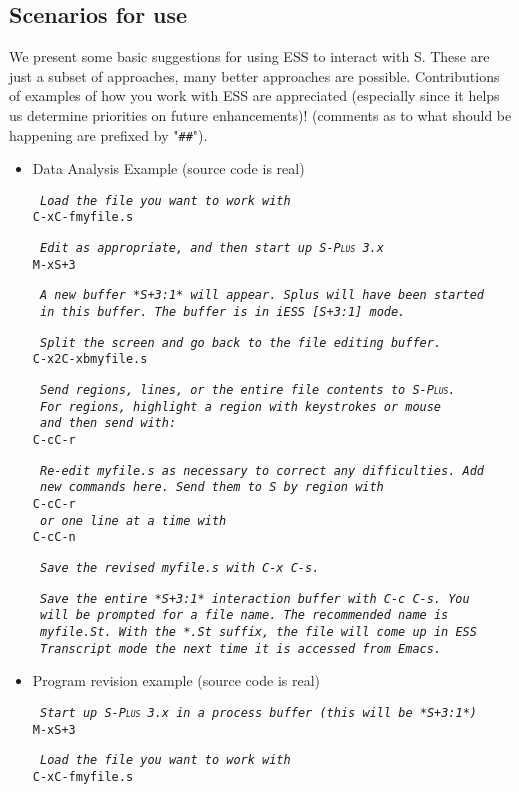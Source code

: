 \documentclass{article}
\newcommand*{\Splus}{\textsc{S-Plus}}
\newcommand*{\Scmt}[1]{\hbox{\qquad {\footnotesize \#\#} \textsl{#1}}}
\newenvironment{Salltt}{\small\begin{alltt}}{\end{alltt}}
\begin{document}
\subsection{Scenarios for use}
\label{sec:S:scenarios}

We present some basic suggestions for using ESS to interact with S.
These are just a subset of approaches, many better approaches are
possible.  Contributions of examples of how you work with ESS are
appreciated (especially since it helps us determine priorities on
future enhancements)! (comments as to what should be happening are
prefixed by "\verb+##+").

\begin{itemize}
\item Data Analysis Example (source code is real)
\begin{Salltt}
  \Scmt{Load the file you want to work with}
  C-x C-f myfile.s

  \Scmt{Edit as appropriate, and then start up \Splus~3.x}
  M-x S+3

  \Scmt{A new buffer *S+3:1* will appear.  Splus will have been started}
  \Scmt{in this buffer.  The buffer is in iESS [S+3:1] mode.}

  \Scmt{Split the screen and go back to the file editing buffer.}
  C-x 2 C-x b myfile.s

  \Scmt{Send regions, lines, or the entire file contents to \Splus.}
  \Scmt{For regions, highlight a region with keystrokes or mouse}
  \Scmt{and then send with:}
  C-c C-r

  \Scmt{Re-edit myfile.s as necessary to correct any difficulties.  Add}
  \Scmt{new commands here.  Send them to S by region with}
  C-c C-r
  \Scmt{or one line at a time with}
  C-c C-n

  \Scmt{Save the revised myfile.s with C-x C-s.}

  \Scmt{Save the entire *S+3:1* interaction buffer with C-c C-s.  You}
  \Scmt{will be prompted for a file name.  The recommended name is}
  \Scmt{myfile.St.  With the *.St suffix, the file will come up in ESS}
  \Scmt{Transcript mode the next time it is accessed from Emacs.}
  \end{Salltt}

\item Program revision example (source code is real)
  \begin{Salltt}
  \Scmt{Start up \Splus~3.x in a process buffer (this will be *S+3:1*)}
  M-x S+3

  \Scmt{Load the file you want to work with}
  C-x C-f myfile.s
  

\end{Salltt}
\end{itemize}
\end{document}
